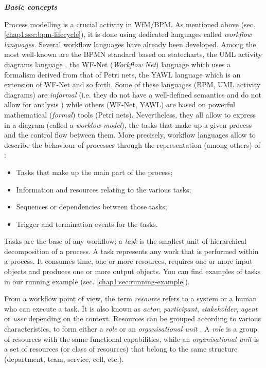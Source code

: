 \label{chap1:sec:bpm-model-activity}
\noindent\textbf{\textit{Basic concepts}}

Process modelling is a crucial activity in WfM/BPM. As mentioned above (sec. \ref{chap1:sec:bpm-lifecycle}), it is done using dedicated languages called \textit{workflow languages}. Several workflow languages have already been developed. Among the most well-known are the BPMN standard \cite{BPMN} based on statecharts, the UML activity diagrams language \cite{booch2000guide}, the WF-Net (\textit{Workflow Net}) language \cite{wil2003business} which uses a formalism derived from that of Petri nets, the YAWL language \cite{van2005yawl} which is an extension of WF-Net and so forth. 
Some of these languages (BPM, UML activity diagrams) are \textit{informal} (i.e. they do not have a well-defined semantics and do not allow for analysis \cite{zur2013much, van2013business}) while others (WF-Net, YAWL) are based on powerful mathematical (\textit{formal}) tools (Petri nets). Nevertheless, they all allow to express in a diagram (called a \textit{worklow model}), the tasks that make up a given process and the control flow between them. More precisely, workflow languages allow to describe the behaviour of processes through the representation (among others) \cite{grigori2001elements} of :
\begin{itemize}
	\item Tasks that make up the main part of the process;
	\item Information and resources relating to the various tasks;
	\item Sequences or dependencies between those tasks;
	\item Trigger and termination events for the tasks.
\end{itemize}

Tasks are the base of any workflow; a \textit{task} is the smallest unit of hierarchical decomposition of a process. A task represents any work that is performed within a process. It consumes time, one or more resources, requires one or more input objects and produces one or more output objects. You can find examples of tasks in our running example (sec. \ref{chap1:sec:running-example}). 

From a workflow point of view, the term \textit{resource} refers to a system or a human who can execute a task. It is also known as \textit{actor}, \textit{participant}, \textit{stakeholder}, \textit{agent} or \textit{user} depending on the context. Resources can be grouped according to various characteristics, to form either a \textit{role} or an \textit{organisational unit} \cite{grigori2001elements}. A \textit{role} is a group of resources with the same functional capabilities, while an \textit{organisational unit} is a set of resources (or class of resources) that belong to the same structure (department, team, service, cell, etc.).

